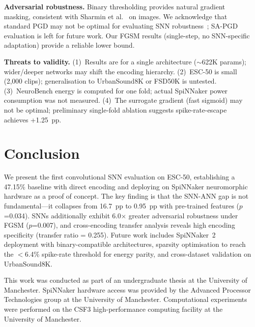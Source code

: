 \documentclass[sigconf,nonacm=false]{acmart}
\begin{document}
\textbf{Adversarial robustness.} Binary thresholding provides natural gradient masking, consistent with Sharmin et al.~\cite{sharmin2020} on images. We acknowledge that standard PGD may not be optimal for evaluating SNN robustness~\cite{wang2025}; SA-PGD evaluation is left for future work. Our FGSM results (single-step, no SNN-specific adaptation) provide a reliable lower bound.

\textbf{Threats to validity.} (1)~Results are for a single architecture ($\sim$622K params); wider/deeper networks may shift the encoding hierarchy. (2)~ESC-50 is small (2{,}000 clips); generalisation to UrbanSound8K or FSD50K is untested. (3)~NeuroBench energy is computed for one fold; actual SpiNNaker power consumption was not measured. (4)~The surrogate gradient (fast sigmoid) may not be optimal; preliminary single-fold ablation suggests spike-rate-escape achieves +1.25~pp.

\section{Conclusion}
\label{sec:conclusion}

We present the first convolutional SNN evaluation on ESC-50, establishing a 47.15\% baseline with direct encoding and deploying on SpiNNaker neuromorphic hardware as a proof of concept. The key finding is that the SNN-ANN gap is not fundamental---it collapses from 16.7~pp to 0.95~pp with pre-trained features ($p$=0.034). SNNs additionally exhibit 6.0$\times$ greater adversarial robustness under FGSM ($p$=0.007), and cross-encoding transfer analysis reveals high encoding specificity (transfer ratio = 0.255). Future work includes SpiNNaker~2~\cite{hoppner2024} deployment with binary-compatible architectures, sparsity optimisation to reach the $<$6.4\% spike-rate threshold for energy parity, and cross-dataset validation on UrbanSound8K.

\begin{acks}
This work was conducted as part of an undergraduate thesis at the University of Manchester. SpiNNaker hardware access was provided by the Advanced Processor Technologies group at the University of Manchester. Computational experiments were performed on the CSF3 high-performance computing facility at the University of Manchester.
\end{acks}
\end{document}
